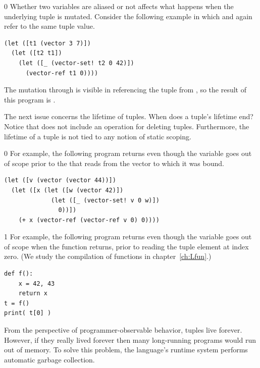 \documentclass[7x10]{TimesAPriori_MIT}%
\def\racketEd{0}
\def\pythonEd{1}
\def\edition{0}
\numberwithin{theorem}{chapter}
\numberwithin{definition}{chapter}
\numberwithin{equation}{chapter}
\begin{document}
{\if\edition\racketEd        
Whether two variables are aliased or not affects what happens
when the underlying tuple is mutated.
Consider the following example in which  and 
again refer to the same tuple value.
\begin{center}
\begin{minipage}{0.96\textwidth}
\begin{lstlisting}
(let ([t1 (vector 3 7)])
  (let ([t2 t1])
    (let ([_ (vector-set! t2 0 42)])
      (vector-ref t1 0))))
\end{lstlisting}
\end{minipage}
\end{center}
The mutation through  is visible in referencing the tuple
from , so the result of this program is .
\fi}

The next issue concerns the lifetime of tuples. When does a tuple's
lifetime end?  Notice that \LangVec{} does not include an operation
for deleting tuples. Furthermore, the lifetime of a tuple is not tied
to any notion of static scoping.
%
{\if\edition\racketEd        
%
For example, the following program returns  even though the
variable  goes out of scope prior to the 
that reads from the vector to which it was bound.
\begin{center}
\begin{minipage}{0.96\textwidth}
\begin{lstlisting}
(let ([v (vector (vector 44))])
  (let ([x (let ([w (vector 42)])
             (let ([_ (vector-set! v 0 w)])
               0))])
    (+ x (vector-ref (vector-ref v 0) 0))))
\end{lstlisting}
\end{minipage}
\end{center}
\fi}
%
{\if\edition\pythonEd
%
For example, the following program returns  even though the
variable  goes out of scope when the function returns, prior
to reading the tuple element at index zero. (We study the compilation
of functions in chapter~\ref{ch:Lfun}.)
%  
\begin{center}
\begin{minipage}{0.96\textwidth}
\begin{lstlisting}
def f():
    x = 42, 43
    return x
t = f()
print( t[0] )
\end{lstlisting}
\end{minipage}
\end{center}
\fi}
%
From the perspective of programmer-observable behavior, tuples live
forever. However, if they really lived forever then many long-running
programs would run out of memory. To solve this problem, the
language's runtime system performs automatic garbage collection.
\end{document}
